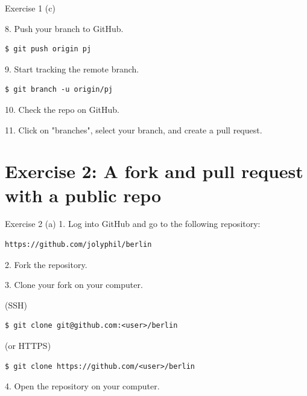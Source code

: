 \documentclass[handout]{beamer}
\begin{document}
\begin{frame}[fragile]{Exercise 1 (c)}

8. Push your branch to GitHub.

\begin{lstlisting}
$ git push origin pj
\end{lstlisting}

9. Start tracking the remote branch.

\begin{lstlisting}
$ git branch -u origin/pj
\end{lstlisting}

10. Check the repo on GitHub.

\vspace{0.3cm}

11. Click on "branches", select your branch, and create a pull request. 

\end{frame}

\section{Exercise 2: A fork and pull request with a public repo}

\begin{frame}[fragile]{Exercise 2 (a)}
1. Log into GitHub and go to the following repository:

\begin{lstlisting}
https://github.com/jolyphil/berlin
\end{lstlisting}

2. Fork the repository.

\vspace{0.3cm}

3. Clone your fork on your computer.

\vspace{0.3cm}

(SSH)
\begin{lstlisting}
$ git clone git@github.com:<user>/berlin
\end{lstlisting}

(or HTTPS)
\begin{lstlisting}
$ git clone https://github.com/<user>/berlin
\end{lstlisting}

4. Open the repository on your computer.


\end{frame}
\end{document}
